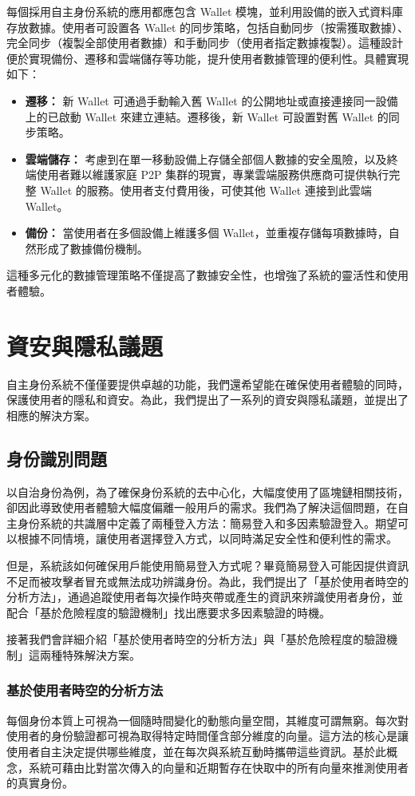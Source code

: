 每個採用自主身份系統的應用都應包含 Wallet 模塊，並利用設備的嵌入式資料庫存放數據。使用者可設置各 Wallet 的同步策略，包括自動同步（按需獲取數據）、完全同步（複製全部使用者數據）和手動同步（使用者指定數據複製）。這種設計便於實現備份、遷移和雲端儲存等功能，提升使用者數據管理的便利性。具體實現如下：
\begin{itemize}
  \item \textbf{遷移：} 新 Wallet 可通過手動輸入舊 Wallet 的公開地址或直接連接同一設備上的已啟動 Wallet 來建立連結。遷移後，新 Wallet 可設置對舊 Wallet 的同步策略。
  \item \textbf{雲端儲存：} 考慮到在單一移動設備上存儲全部個人數據的安全風險，以及終端使用者難以維護家庭 P2P 集群的現實，專業雲端服務供應商可提供執行完整 Wallet 的服務。使用者支付費用後，可使其他 Wallet 連接到此雲端 Wallet。
  \item \textbf{備份：} 當使用者在多個設備上維護多個 Wallet，並重複存儲每項數據時，自然形成了數據備份機制。
\end{itemize}
這種多元化的數據管理策略不僅提高了數據安全性，也增強了系統的靈活性和使用者體驗。
\section{資安與隱私議題}
自主身份系統不僅僅要提供卓越的功能，我們還希望能在確保使用者體驗的同時，保護使用者的隱私和資安。為此，我們提出了一系列的資安與隱私議題，並提出了相應的解決方案。
\subsection{身份識別問題}
以自治身份為例，為了確保身份系統的去中心化，大幅度使用了區塊鏈相關技術，卻因此導致使用者體驗大幅度偏離一般用戶的需求。我們為了解決這個問題，在自主身份系統的共識層中定義了兩種登入方法：簡易登入和多因素驗證登入。期望可以根據不同情境，讓使用者選擇登入方式，以同時滿足安全性和便利性的需求。

但是，系統該如何確保用戶能使用簡易登入方式呢？畢竟簡易登入可能因提供資訊不足而被攻擊者冒充或無法成功辨識身份。為此，我們提出了「基於使用者時空的分析方法」，通過追蹤使用者每次操作時夾帶或產生的資訊來辨識使用者身份，並配合「基於危險程度的驗證機制」找出應要求多因素驗證的時機。

接著我們會詳細介紹「基於使用者時空的分析方法」與「基於危險程度的驗證機制」這兩種特殊解決方案。
\subsubsection{基於使用者時空的分析方法}
每個身份本質上可視為一個隨時間變化的動態向量空間，其維度可謂無窮。每次對使用者的身份驗證都可視為取得特定時間僅含部分維度的向量。這方法的核心是讓使用者自主決定提供哪些維度，並在每次與系統互動時攜帶這些資訊。基於此概念，系統可藉由比對當次傳入的向量和近期暫存在快取中的所有向量來推測使用者的真實身份。

